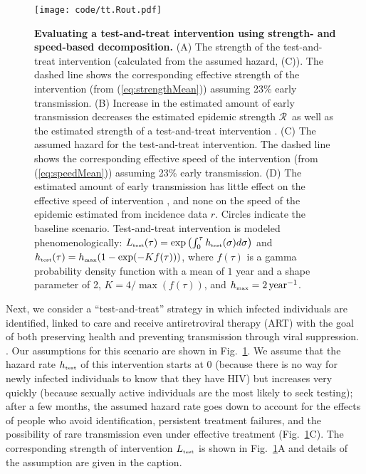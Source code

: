\documentclass[12pt]{article}
\newcommand{\RR}{\ensuremath{{\mathcal R}}}
\newcommand{\Rhat}{\ensuremath{{\hat\RR}}}
\newcommand{\rr}{\ensuremath{{r}}}
\newcommand{\rhat}{\ensuremath{{\hat\rr}}}
\newcommand{\tsub}[2]{#1_{{\textrm{\tiny #2}}}}
\newcommand{\figref}[1]{Fig.~\ref{fig:#1}}
\newcommand{\figlab}[1]{\label{fig:#1}}
\newcommand{\eqref}[1]{(\ref{eq:#1})}
\providecommand{\DIFaddtex}[1]{{\protect\color{blue}\uwave{#1}}} %
\providecommand{\DIFaddFL}[1]{\DIFadd{#1}} %
\providecommand{\DIFaddbeginFL}{} %
\providecommand{\DIFaddendFL}{} %
\providecommand{\DIFdelbeginFL}{} %
\providecommand{\DIFdelendFL}{} %
\providecommand{\DIFadd}[1]{\texorpdfstring{\DIFaddtex{#1}}{#1}} %
\newcommand{\DIFscaledelfig}{0.5}
\newlength{\DIFdelgraphicswidth} %
\newlength{\DIFdelgraphicsheight} %
\newcommand{\DIFaddincludegraphics}[2][]{{\color{blue}\fbox{\DIFOincludegraphics[#1]{#2}}}} %
\newcommand{\DIFdelincludegraphics}[2][]{%
\sbox{\DIFdelgraphicsbox}{\DIFOincludegraphics[#1]{#2}}%
\settoboxwidth{\DIFdelgraphicswidth}{\DIFdelgraphicsbox} %
\settoboxtotalheight{\DIFdelgraphicsheight}{\DIFdelgraphicsbox} %
\scalebox{\DIFscaledelfig}{%
\parbox[b]{\DIFdelgraphicswidth}{\usebox{\DIFdelgraphicsbox}\\[-\baselineskip] \rule{\DIFdelgraphicswidth}{0em}}\llap{\resizebox{\DIFdelgraphicswidth}{\DIFdelgraphicsheight}{%
\setlength{\unitlength}{\DIFdelgraphicswidth}%
\begin{picture}(1,1)%
\thicklines\linethickness{2pt} %
{\color[rgb]{1,0,0}\put(0,0){\framebox(1,1){}}}%
{\color[rgb]{1,0,0}\put(0,0){\line( 1,1){1}}}%
{\color[rgb]{1,0,0}\put(0,1){\line(1,-1){1}}}%
\end{picture}%
}\hspace*{3pt}}} %
} %
\DeclareRobustCommand{\DIFaddbeginFL}{\DIFOaddbeginFL \let\includegraphics\DIFaddincludegraphics} %
\DeclareRobustCommand{\DIFaddendFL}{\DIFOaddendFL \let\includegraphics\DIFOincludegraphics} %
\DeclareRobustCommand{\DIFdelbeginFL}{\DIFOdelbeginFL \let\includegraphics\DIFdelincludegraphics} %
\DeclareRobustCommand{\DIFdelendFL}{\DIFOaddendFL \let\includegraphics\DIFOincludegraphics} %
\begin{document}
\begin{figure}[!t]
\texttt{[image: code/tt.Rout.pdf]}
\caption{
\textbf{Evaluating a test-and-treat intervention using strength- and speed-based decomposition.}
(A) The strength of the test-and-treat intervention (calculated from the assumed hazard, (C)). The dashed line shows the corresponding effective strength of the intervention (from \eqref{strengthMean}) assuming 23\% early transmission.
(B) Increase in the estimated amount of early transmission decreases the estimated epidemic strength \RR\ as well as the estimated strength of a test-and-treat intervention \DIFdelbeginFL %
\DIFdelendFL \DIFaddbeginFL \DIFaddFL{$\theta$}\DIFaddendFL .
(C) The assumed hazard for the test-and-treat intervention. 
The dashed line shows the corresponding effective speed of the intervention (from \eqref{speedMean}) assuming 23\% early transmission.
(D) The estimated amount of early transmission has little effect on the effective speed of intervention \DIFdelbeginFL %
\DIFdelendFL \DIFaddbeginFL \DIFaddFL{$\phi$}\DIFaddendFL , and none on the \DIFaddbeginFL \DIFaddFL{initial }\DIFaddendFL speed of the epidemic estimated from incidence data \rr.
Circles indicate the baseline scenario.
Test-and-treat intervention is modeled phenomenologically: $\tsub{L}{test}(\tau) = \exp\left(\int_0^\tau \tsub{h}{test}(\sigma) d\sigma \right)$ and $\tsub{h}{test}(\tau) = \tsub{h}{max} (1 - \exp(- K f(\tau)))$, where $f(\tau)$ is a gamma probability density function with a mean of $1$ year and a shape parameter of 2, $K = 4/\max(f(\tau))$, and $\tsub{h}{max} = 2\,\mathrm{year}^{-1}$.
}
\figlab{test}
\end{figure}

Next, we consider a ``test-and-treat'' strategy in which infected individuals are identified, linked to care and receive antiretroviral therapy (ART) with the goal of both preserving health and preventing transmission through viral suppression. \citep{garnett2009treating, granich2009universal, nah2017test}.
Our assumptions for this scenario are shown in \figref{test}.
We assume that the hazard rate $\tsub{h}{test}$ of this intervention starts at 0 (because there is no way for newly infected individuals to know that they have HIV) but increases very quickly (because sexually active individuals are the most likely to seek testing); 
after a few months, the assumed hazard rate goes down to account for the effects of people who avoid identification, persistent treatment failures, and the possibility of rare transmission even under effective treatment (\figref{test}C). The corresponding strength of intervention $\tsub{L}{test}$ is shown in \figref{test}A and details of the assumption are given in the caption.
\end{document}
